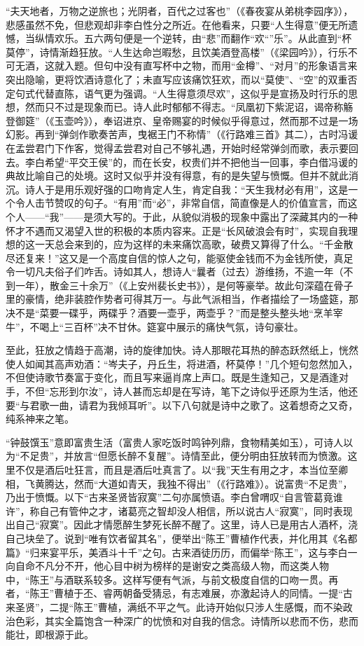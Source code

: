 \documentclass[letterpaper,12pt,english]{sphinxmanual}
\begin{document}
“夫天地者，万物之逆旅也；光阴者，百代之过客也”（《春夜宴从弟桃李园序》），悲感虽然不免，但悲观却非李白性分之所近。在他看来，只要“人生得意”便无所遗憾，当纵情欢乐。五六两句便是一个逆转，由“悲”而翻作“欢“”乐”。从此直到“杯莫停”，诗情渐趋狂放。“人生达命岂暇愁，且饮美酒登高楼”（《梁园吟》），行乐不可无酒，这就入题。但句中没有直写杯中之物，而用“金樽”、“对月”的形象语言来突出隐喻，更将饮酒诗意化了；未直写应该痛饮狂欢，而以“莫使”、“空”的双重否定句式代替直陈，语气更为强调。“人生得意须尽欢”，这似乎是宣扬及时行乐的思想，然而只不过是现象而已。诗人此时郁郁不得志。“凤凰初下紫泥诏，谒帝称觞登御筵”（《玉壶吟》），奉诏进京、皇帝赐宴的时候似乎得意过，然而那不过是一场幻影。再到“弹剑作歌奏苦声，曳裾王门不称情”（《行路难三首》其二），古时冯谖在孟尝君门下作客，觉得孟尝君对自己不够礼遇，开始时经常弹剑而歌，表示要回去。李白希望“平交王侯”的，而在长安，权贵们并不把他当一回事，李白借冯谖的典故比喻自己的处境。这时又似乎并没有得意，有的是失望与愤慨。但并不就此消沉。诗人于是用乐观好强的口吻肯定人生，肯定自我：“天生我材必有用”，这是一个令人击节赞叹的句子。“有用”而“必”，非常自信，简直像是人的价值宣言，而这个人——“我”——是须大写的。于此，从貌似消极的现象中露出了深藏其内的一种怀才不遇而又渴望入世的积极的本质内容来。正是“长风破浪会有时”，实现自我理想的这一天总会来到的，应为这样的未来痛饮高歌，破费又算得了什么。“千金散尽还复来！”这又是一个高度自信的惊人之句，能驱使金钱而不为金钱所使，真足令一切凡夫俗子们咋舌。诗如其人，想诗人“曩者（过去）游维扬，不逾一年（不到一年），散金三十余万”（《上安州裴长史书》），是何等豪举。故此句深蕴在骨子里的豪情，绝非装腔作势者可得其万一。与此气派相当，作者描绘了一场盛筵，那决不是“菜要一碟乎，两碟乎？酒要一壶乎，两壶乎？”而是整头整头地“烹羊宰牛”，不喝上“三百杯”决不甘休。筵宴中展示的痛快气氛，诗句豪壮。

至此，狂放之情趋于高潮，诗的旋律加快。诗人那眼花耳热的醉态跃然纸上，恍然使人如闻其高声劝酒：“岑夫子，丹丘生，将进酒，杯莫停！”几个短句忽然加入，不但使诗歌节奏富于变化，而且写来逼肖席上声口。既是生逢知己，又是酒逢对手，不但“忘形到尔汝”，诗人甚而忘却是在写诗，笔下之诗似乎还原为生活，他还要“与君歌一曲，请君为我倾耳听”。以下八句就是诗中之歌了。这着想奇之又奇，纯系神来之笔。

“钟鼓馔玉”意即富贵生活（富贵人家吃饭时鸣钟列鼎，食物精美如玉），可诗人以为“不足贵”，并放言“但愿长醉不复醒”。诗情至此，便分明由狂放转而为愤激。这里不仅是酒后吐狂言，而且是酒后吐真言了。以“我”天生有用之才，本当位至卿相，飞黄腾达，然而“大道如青天，我独不得出”（《行路难》）。说富贵“不足贵”，乃出于愤慨。以下“古来圣贤皆寂寞”二句亦属愤语。李白曾喟叹“自言管葛竟谁许”，称自己有管仲之才，诸葛亮之智却没人相信，所以说古人“寂寞”，同时表现出自己“寂寞”。因此才情愿醉生梦死长醉不醒了。这里，诗人已是用古人酒杯，浇自己块垒了。说到“唯有饮者留其名”，便举出“陈王”曹植作代表，并化用其《名都篇》“归来宴平乐，美酒斗十千”之句。古来酒徒历历，而偏举“陈王”，这与李白一向自命不凡分不开，他心目中树为榜样的是谢安之类高级人物，而这类人物中，“陈王”与酒联系较多。这样写便有气派，与前文极度自信的口吻一贯。再者，“陈王”曹植于丕、睿两朝备受猜忌，有志难展，亦激起诗人的同情。一提“古来圣贤”，二提“陈王”曹植，满纸不平之气。此诗开始似只涉人生感慨，而不染政治色彩，其实全篇饱含一种深广的忧愤和对自我的信念。诗情所以悲而不伤，悲而能壮，即根源于此。
\end{document}
